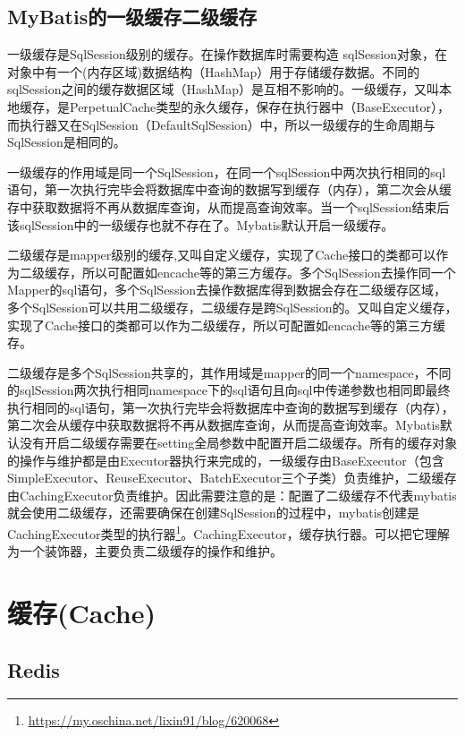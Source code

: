 \documentclass[../../../interview-questions.tex]{subfiles}
\begin{document}
\subsection{MyBatis的一级缓存二级缓存}

一级缓存是SqlSession级别的缓存。在操作数据库时需要构造 sqlSession对象，在对象中有一个(内存区域)数据结构（HashMap）用于存储缓存数据。不同的sqlSession之间的缓存数据区域（HashMap）是互相不影响的。一级缓存，又叫本地缓存，是PerpetualCache类型的永久缓存，保存在执行器中（BaseExecutor），而执行器又在SqlSession（DefaultSqlSession）中，所以一级缓存的生命周期与SqlSession是相同的。

一级缓存的作用域是同一个SqlSession，在同一个sqlSession中两次执行相同的sql语句，第一次执行完毕会将数据库中查询的数据写到缓存（内存），第二次会从缓存中获取数据将不再从数据库查询，从而提高查询效率。当一个sqlSession结束后该sqlSession中的一级缓存也就不存在了。Mybatis默认开启一级缓存。

二级缓存是mapper级别的缓存,又叫自定义缓存，实现了Cache接口的类都可以作为二级缓存，所以可配置如encache等的第三方缓存。多个SqlSession去操作同一个Mapper的sql语句，多个SqlSession去操作数据库得到数据会存在二级缓存区域，多个SqlSession可以共用二级缓存，二级缓存是跨SqlSession的。又叫自定义缓存，实现了Cache接口的类都可以作为二级缓存，所以可配置如encache等的第三方缓存。

二级缓存是多个SqlSession共享的，其作用域是mapper的同一个namespace，不同的sqlSession两次执行相同namespace下的sql语句且向sql中传递参数也相同即最终执行相同的sql语句，第一次执行完毕会将数据库中查询的数据写到缓存（内存），第二次会从缓存中获取数据将不再从数据库查询，从而提高查询效率。Mybatis默认没有开启二级缓存需要在setting全局参数中配置开启二级缓存。所有的缓存对象的操作与维护都是由Executor器执行来完成的，一级缓存由BaseExecutor（包含SimpleExecutor、ReuseExecutor、BatchExecutor三个子类）负责维护，二级缓存由CachingExecutor负责维护。因此需要注意的是：配置了二级缓存不代表mybatis就会使用二级缓存，还需要确保在创建SqlSession的过程中，mybatis创建是CachingExecutor类型的执行器\footnote{\url{https://my.oschina.net/lixin91/blog/620068}}。CachingExecutor，缓存执行器。可以把它理解为一个装饰器，主要负责二级缓存的操作和维护。


\section{缓存(Cache)}

\subsection{Redis}
\end{document}
